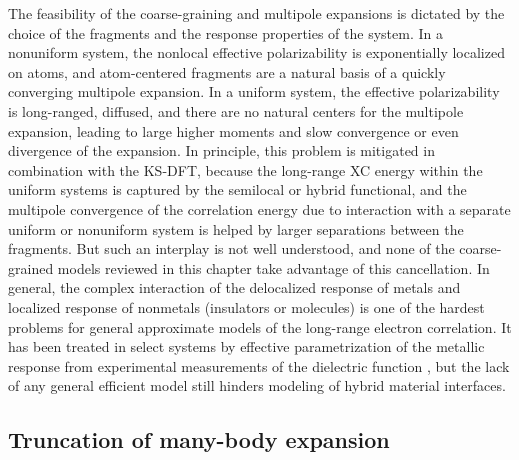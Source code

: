 The feasibility of the coarse-graining and multipole expansions is dictated by the choice of the fragments and the response properties of the system.
In a nonuniform system, the nonlocal effective polarizability is exponentially localized on atoms, and atom-centered fragments are a natural basis of a quickly converging multipole expansion.
In a uniform system, the effective polarizability is long-ranged, diffused, and there are no natural centers for the multipole expansion, leading to large higher moments and slow convergence or even divergence of the expansion.
In principle, this problem is mitigated in combination with the KS-DFT, because the long-range XC energy within the uniform systems is captured by the semilocal or hybrid functional, and the multipole convergence of the correlation energy due to interaction with a separate uniform or nonuniform system is helped by larger separations between the fragments.
But such an interplay is not well understood, and none of the coarse-grained models reviewed in this chapter take advantage of this cancellation.
In general, the complex interaction of the delocalized response of metals and localized response of nonmetals (insulators or molecules) is one of the hardest problems for general approximate models of the long-range electron correlation.
It has been treated in select systems by effective parametrization of the metallic response from experimental measurements of the dielectric function \citep{RuizPRL12}, but the lack of any general efficient model still hinders modeling of hybrid material interfaces.

\subsection{Truncation of many-body expansion}

